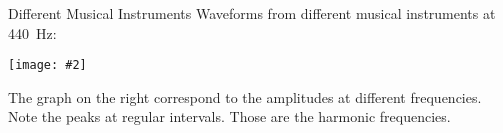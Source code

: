 \documentclass[12pt,compress,aspectratio=169]{beamer}
\newcommand{\pic}[2]{\texttt{[image: \#2]}}
\begin{document}
\begin{frame}{Different Musical Instruments}
  Waveforms from different musical instruments at \SI{440}{\hertz}:
  \begin{center}
    \pic{.65}{F_InstrumentWaves.png}
  \end{center}
  The graph on the right correspond to the amplitudes at different frequencies.
  Note the peaks at regular intervals. Those are the harmonic frequencies.
\end{frame}




%    
\end{document}
